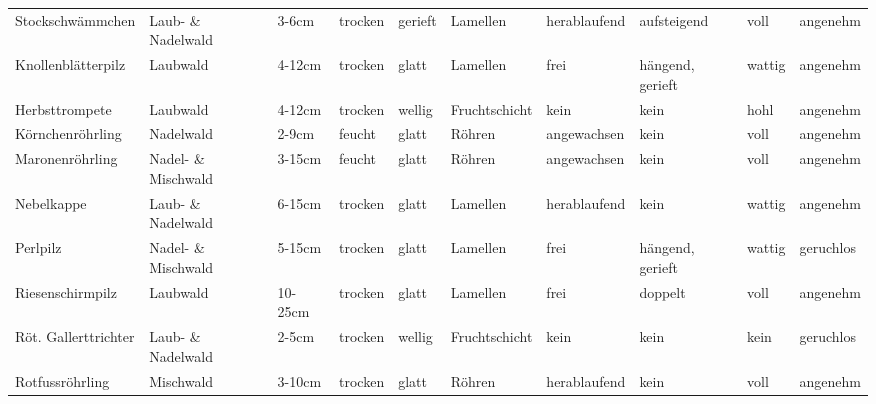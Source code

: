 \begin{sidewaystable}[h]
\begin{center}
\begin{tabular}{l | l | l | l | l | l | l | l | l | l}
			Stockschwämmchen & Laub- \& Nadelwald  & 3-6cm                   & trocken                & gerieft          & Lamellen              & herablaufend             & aufsteigend       & voll           & angenehm        \\
			Knollenblätterpilz & Laubwald             & 4-12cm                  & trocken                & glatt            & Lamellen              & frei                     & hängend, gerieft & wattig         & angenehm        \\
			Herbsttrompete            & Laubwald             & 4-12cm                  & trocken                & wellig           & Fruchtschicht         & kein                     & kein              & hohl           & angenehm        \\
			Körnchenröhrling          & Nadelwald            & 2-9cm                   & feucht                 & glatt            & Röhren                & angewachsen              & kein              & voll           & angenehm        \\
			Maronenröhrling           & Nadel- \& Mischwald & 3-15cm                  & feucht                 & glatt            & Röhren                & angewachsen              & kein              & voll           & angenehm        \\
			Nebelkappe                & Laub- \& Nadelwald  & 6-15cm                  & trocken                & glatt            & Lamellen              & herablaufend             & kein              & wattig         & angenehm        \\
			Perlpilz                  & Nadel- \& Mischwald & 5-15cm                  & trocken                & glatt            & Lamellen              & frei                     & hängend, gerieft & wattig         & geruchlos       \\
			Riesenschirmpilz          & Laubwald             & 10-25cm                 & trocken                & glatt            & Lamellen              & frei                     & doppelt           & voll           & angenehm        \\
			Röt. Gallerttrichter & Laub- \& Nadelwald  & 2-5cm                   & trocken                & wellig           & Fruchtschicht         & kein                     & kein              & kein           & geruchlos       \\
			Rotfussröhrling           & Mischwald            & 3-10cm                  & trocken                & glatt            & Röhren                & herablaufend             & kein              & voll           & angenehm        \\

\end{tabular}
\end{center}
\end{sidewaystable}
